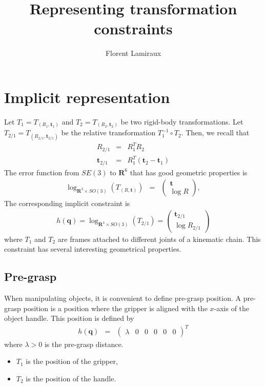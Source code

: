 \documentclass {article}
\title {Representing transformation constraints}
\author {Florent Lamiraux}
\date {}
\newcommand\trans{\mathbf{t}}
\newcommand\conf{\mathbf{q}}
\newcommand\reals{\mathbf{R}}
\newcommand\logRSO{\log_{\reals^3\times SO(3)}}
\begin{document}
\maketitle

\section {Implicit representation}\label{sec:implicit}

Let $T_1 = T_{(R_1,\trans_1)}$ and $T_2 = T_{(R_2,\trans_2)}$ be two rigid-body transformations. Let $T_{2/1} = T_{(R_{2/1},\trans_{2/1})}$ be the relative transformation $T_1^{-1}\circ T_2$. Then, we recall that
\begin{eqnarray*}
  R_{2/1} &=& R_1^T R_2 \\
  \trans_{2/1} &=& R_1^T (\trans_2-\trans_1)
\end{eqnarray*}
The error function from $SE(3)$ to $\reals^6$ that has good geometric properties is
\begin{eqnarray*}
  \logRSO (T_{(R,\trans)}) &=& \left(\begin {array}{c} \trans \\ \log R \end{array}\right),
\end {eqnarray*}
The corresponding implicit constraint is
\begin {eqnarray}\label{eq:error-se3}
h (\conf) = \logRSO (T_{2/1}) = \left(\begin {array}{c} \trans_{2/1} \\ \log R_{2/1} \end{array}\right)
\end {eqnarray}
where $T_1$ and $T_2$ are frames attached to different joints of a kinematic chain. This constraint has several interesting geometrical properties.

\subsection {Pre-grasp}

When manipulating objects, it is convenient to define pre-grasp position. A pre-grasp position is a position where the gripper is aligned with the $x$-axis of the object handle. This position is defined by
\begin {eqnarray}\label{eq:pregrasp}
  h (\conf) &=& \left (\begin {array}{cccccc} \lambda & 0 & 0 & 0 & 0 & 0 \end{array}\right)^{T}
\end {eqnarray}
where $\lambda > 0$ is the pre-grasp distance.
\begin{itemize}
\item $T_1$ is the position of the gripper,
\item $T_2$ is the position of the handle.
\end {itemize}
\end{document}
